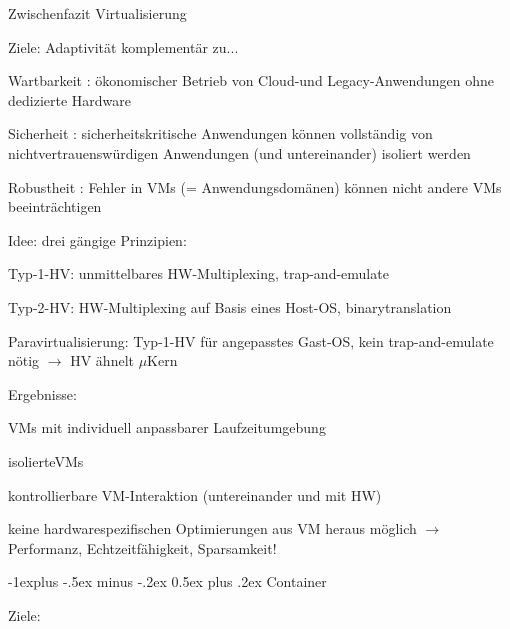 \documentclass[a4paper]{article}
\makeatletter
\newcommand{\cmark}{\ding{51}}
\newcommand{\xmark}{\ding{55}}
\renewcommand{\subsection}{\@startsection{subsection}{2}{0mm}%
 {-1explus -.5ex minus -.2ex}%
 {0.5ex plus .2ex}%
 {\normalfont\normalsize\bfseries}}
\makeatother
\begin{document}
\begin{multicols}{3}
    Zwischenfazit Virtualisierung

    \begin{itemize*}
        \item Ziele: Adaptivität komplementär zu...
        \begin{itemize*}
            \item Wartbarkeit : ökonomischer Betrieb von Cloud-und Legacy-Anwendungen ohne dedizierte Hardware
            \item Sicherheit : sicherheitskritische Anwendungen können vollständig von nichtvertrauenswürdigen Anwendungen (und untereinander) isoliert werden
            \item Robustheit : Fehler in VMs (= Anwendungsdomänen) können nicht andere VMs beeinträchtigen
        \end{itemize*}
        \item Idee: drei gängige Prinzipien:
        \begin{itemize*}
            \item Typ-1-HV: unmittelbares HW-Multiplexing, trap-and-emulate
            \item Typ-2-HV: HW-Multiplexing auf Basis eines Host-OS, binarytranslation
            \item Paravirtualisierung: Typ-1-HV für angepasstes Gast-OS, kein trap-and-emulate nötig $\rightarrow$ HV ähnelt $\mu$Kern
        \end{itemize*}
        \item Ergebnisse:
        \begin{itemize*}
            \item[\cmark] VMs mit individuell anpassbarer Laufzeitumgebung
            \item[\cmark] isolierteVMs
            \item[\cmark] kontrollierbare VM-Interaktion (untereinander und mit HW)
            \item[\xmark] keine hardwarespezifischen Optimierungen aus VM heraus möglich $\rightarrow$ Performanz, Echtzeitfähigkeit, Sparsamkeit!
        \end{itemize*}
    \end{itemize*}


    \subsection{Container}

    Ziele:


\end{multicols}
\end{document}
